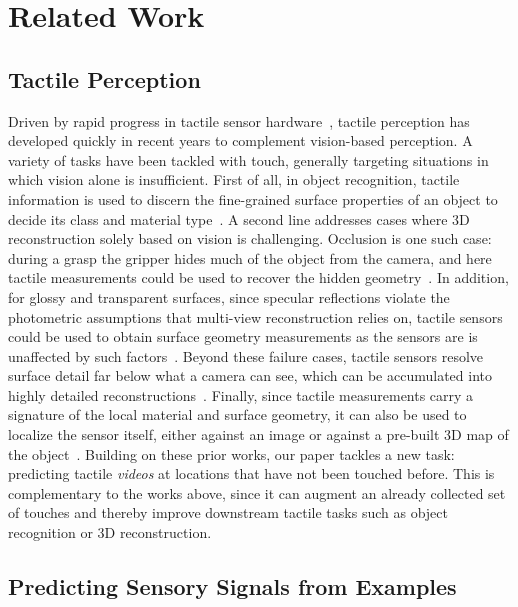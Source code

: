 \section{Related Work}
\label{sec:related}

\subsection{Tactile Perception}

Driven by rapid progress in tactile sensor hardware~\cite{gelsight}, tactile perception has
developed quickly in recent years to complement vision-based perception. A variety of tasks
have been tackled with touch, generally targeting situations in which vision alone is
insufficient.
First of all, in object recognition, tactile information is used to discern the fine-grained surface properties of an object to decide its class and material type~\cite{textureuneven,glovetactile,triboelectrictactile,bagoffeatures,dotsim}.
A second line addresses cases where 3D reconstruction solely based on vision is challenging. 
Occlusion is one such case: during a grasp the gripper hides much of the object from the camera, and here tactile measurements could be used to recover the hidden geometry~\cite{neuralfeels,touchsdf}.
In addition, for glossy and transparent surfaces, since specular reflections violate the photometric assumptions that multi-view reconstruction relies on, tactile sensors could be used to obtain surface geometry measurements as the sensors are is unaffected by such factors~\cite{snaptapsplat,splattouch,touchgs}.
Beyond these failure cases, tactile sensors resolve
surface detail far below what a camera can see, which can be accumulated into highly detailed
reconstructions~\cite{gelslam}.
Finally, since tactile measurements carry a signature of the local material and surface geometry, it
can also be used to localize the sensor itself, either against an image or against a pre-built
3D map of the object~\cite{tacloc,splattouch,normalflow}.
Building on these prior works, our paper tackles a new task: predicting tactile \emph{videos} at
locations that have not been touched before.
This is complementary to the works above, since it can
augment an already collected set of touches and thereby improve downstream tactile tasks such as
object recognition or 3D reconstruction.

\subsection{Predicting Sensory Signals from Examples}

